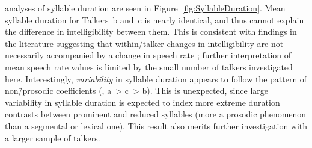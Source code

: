 \Ph{} analyses of syllable duration are seen in Figure~\ref{fig:SyllableDuration}.  Mean syllable duration for Talkers~\ac{b} and~\ac{c} is nearly identical, and thus cannot explain the difference in intelligibility between them.  This is consistent with findings in the literature suggesting that within\-/talker changes in intelligibility are not necessarily accompanied by a change in speech rate \citep{KrauseBraida2002}; further interpretation of mean speech rate values is limited by the small number of talkers investigated here.  Interestingly, \emph{variability} in syllable duration appears to follow the pattern of non\=/prosodic coefficients (\ie, \ac{a}~> \ac{c}~> \ac{b}).  This is unexpected, since large variability in syllable duration is expected to index more extreme duration contrasts between prominent and reduced syllables (more a prosodic phenomenon than a segmental or lexical one).  This result also merits further investigation with a larger sample of talkers.

